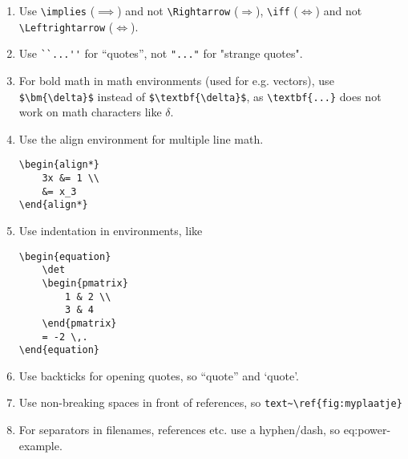 \documentclass[11pt]{article}
\begin{document}
\begin{enumerate}
        \item Use \verb|\implies| ($\implies$) and not \verb|\Rightarrow| ($\Rightarrow$), \verb|\iff| ($\iff$) and not \verb|\Leftrightarrow| ($\Leftrightarrow$).

        \item Use \verb|``...''| for ``quotes'', not \verb|"..."| for "strange quotes".

        \item For bold math in math environments (used for e.g. vectors), use \verb|$\bm{\delta}$| instead of \verb|$\textbf{\delta}$|, as        \verb|\textbf{...}| does not work on math characters like $\delta$.

        \item Use the align environment for multiple line math.
            \begin{lstlisting}
\begin{align*}
    3x &= 1 \\
    &= x_3
\end{align*}
            \end{lstlisting}

        \item Use indentation in environments, like
            \begin{lstlisting}
\begin{equation}
    \det
    \begin{pmatrix}
        1 & 2 \\
        3 & 4
    \end{pmatrix}
    = -2 \,.
\end{equation}
            \end{lstlisting}
        \item Use backticks for opening quotes, so ``quote'' and `quote'.
        \item Use non-breaking spaces in front of references, so \verb|text~\ref{fig:myplaatje}|
        \item For separators in filenames, references etc. use a hyphen/dash, so eq:power-example.
    \end{enumerate}
\end{document}
